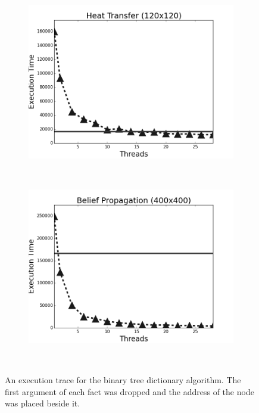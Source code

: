 \begin{figure}[h]
\begin{subfigure}[b]{0.5\textwidth}
                \label{fig:implementation:scale_minmax}
        \end{subfigure}\\
        \begin{subfigure}[b]{0.5\textwidth}
                \includegraphics[width=\textwidth]{experiments/scalability/scale-new-heat-transfer-120.png}
                \label{fig:implementation:scale_heat}
        \end{subfigure}%
        ~
        \begin{subfigure}[b]{0.5\textwidth}
                \includegraphics[width=\textwidth]{experiments/scalability/scale-belief-propagation-400.png}

                \label{fig:implementation:scale_bp}
        \end{subfigure}\\
        \caption{An execution trace for the binary tree dictionary
           algorithm. The first argument of each fact was dropped and the
           address of the node was placed beside it.}
        \label{fig:implementation:scale1}
\end{figure}

